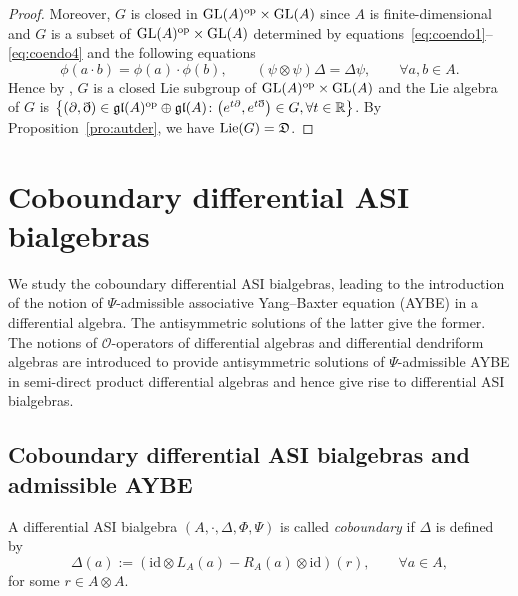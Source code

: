 \documentclass[pdftex]{sigma}
\numberwithin{equation}{section}
\newcommand{\id}{\mathrm{id}}
\begin{document}
\begin{proof}
Moreover, $G$ is closed in ${\rm GL}(A)^{\rm op} \times {\rm GL}(A)$ since $A$ is finite-dimensional and $G$ is a subset of ${\rm GL}(A)^{\rm op} \times {\rm GL}(A)$ determined by equations~\eqref{eq:coendo1}--\eqref{eq:coendo4} and the following equations
\begin{equation*}
 \phi(a \cdot b) = \phi(a) \cdot \phi(b), \qquad (\psi \otimes \psi) \Delta = \Delta \psi, \qquad \forall a, b \in A.
\end{equation*}
Hence by \cite[Theorem~6.9]{SW}, $G$ is a closed Lie subgroup of ${\rm GL}(A)^{\rm op} \times {\rm GL}(A)$ and the Lie algebra of $G$ is
$\big\{(\partial, \eth) \in \mathfrak{gl}(A)^{\rm op} \oplus \mathfrak{gl}(A)\colon \big(e^{t\partial}, e^{t\eth}\big) \in G, \forall t \in \mathbb{R}\big\}$.
By Proposition~\ref{pro:autder}, we have ${\rm Lie}(G) = \mathfrak{D}$.
\end{proof}



\section{Coboundary differential ASI bialgebras}\label{sec:cob}

We study the coboundary differential ASI bialgebras, leading to
the introduction of the notion of $\Psi$-admissible associative
Yang--Baxter equation (AYBE) in a differential algebra. The
antisymmetric solutions of the latter give the former. The notions
of $\mathcal{O}$-operators of differential algebras and
differential dendriform algebras are introduced to provide
antisymmetric solutions of $\Psi$-admissible AYBE in semi-direct
product differential algebras and hence give rise to differential
ASI bialgebras.


\subsection{Coboundary differential ASI bialgebras and admissible AYBE}\label{subsec:cobdasi}

\begin{Definition}\label{def:cobdasi}
 A differential ASI bialgebra $(A, \cdot, \Delta, \Phi, \Psi)$ is called \textit{coboundary}
 if $\Delta$ is defined by
 \begin{equation}
 \Delta(a) := (\id \otimes L_A(a) - R_A(a) \otimes \id)(r), \qquad \forall a \in A, \label{eq:cbd}
 \end{equation}
 for some $r \in A \otimes A$.
\end{Definition}
\end{document}
